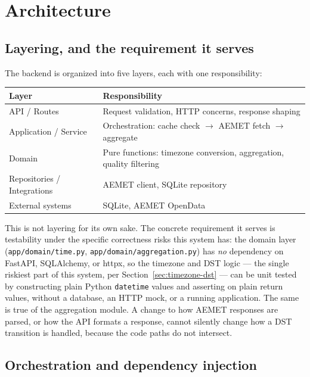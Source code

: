 \documentclass[11pt,a4paper]{article}
\begin{document}
\section{Architecture}
\label{sec:architecture}

\subsection{Layering, and the requirement it serves}

The backend is organized into five layers, each with one responsibility:

\begin{center}
\begin{tabular}{@{}ll@{}}
\toprule
\textbf{Layer} & \textbf{Responsibility} \\
\midrule
API / Routes & Request validation, HTTP concerns, response shaping \\
Application / Service & Orchestration: cache check $\rightarrow$ AEMET fetch $\rightarrow$ aggregate \\
Domain & Pure functions: timezone conversion, aggregation, quality filtering \\
Repositories / Integrations & AEMET client, SQLite repository \\
External systems & SQLite, AEMET OpenData \\
\bottomrule
\end{tabular}
\end{center}

This is not layering for its own sake. The concrete requirement it serves is
testability under the specific correctness risks this system has: the
domain layer (\texttt{app/domain/time.py}, \texttt{app/domain/aggregation.py})
has \emph{no} dependency on FastAPI, SQLAlchemy, or httpx, so the timezone
and DST logic --- the single riskiest part of this system, per
Section~\ref{sec:timezone-dst} --- can be unit tested by constructing plain
Python \texttt{datetime} values and asserting on plain return values,
without a database, an HTTP mock, or a running application. The same is
true of the aggregation module. A change to how AEMET responses are parsed,
or how the API formats a response, cannot silently change how a DST
transition is handled, because the code paths do not intersect.

\subsection{Orchestration and dependency injection}
\end{document}
